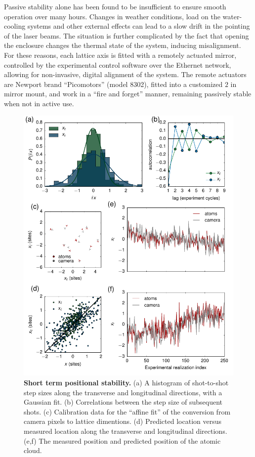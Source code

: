 \documentclass[twocolumn,aps,pra,showpacs,preprintnumbers,bibnotes]{revtex4-1}
\begin{document}
Passive stability alone has been found to be insufficient to ensure smooth operation over many hours. Changes in weather conditions, load on the water-cooling systems and other external effects can lead to a slow drift in the pointing of the laser beams. 
The situation is further complicated by the fact that opening the enclosure changes the thermal state of the system, inducing misalignment. 
For these reasons, each lattice axis is fitted with a remotely actuated mirror, controlled by the experimental control software over the Ethernet network, allowing for non-invasive, digital alignment of the system. 
The remote actuators are Newport brand ``Picomotors'' (model 8302), fitted into a customized $2$ in mirror mount, and work in a ``fire and forget'' manner, remaining passively stable when not in active use.

\begin{figure}
  \begin{center}
    \includegraphics{fig/pointing_figure.pdf}
    \caption{\textbf{Short term positional stability.} (a) A histogram of shot-to-shot step sizes along the transverse and longitudinal directions, with a Gaussian fit. (b) Correlations between the step size of subsequent shots. (c) Calibration data for the ``affine fit'' of the conversion from camera pixels to lattice dimentions. (d) Predicted location versus measured location along the transverse and longitudinal directions. (e,f) The measured position and predicted position of the atomic cloud.}\label{fig:stability}
  \end{center}
\end{figure}
\end{document}
